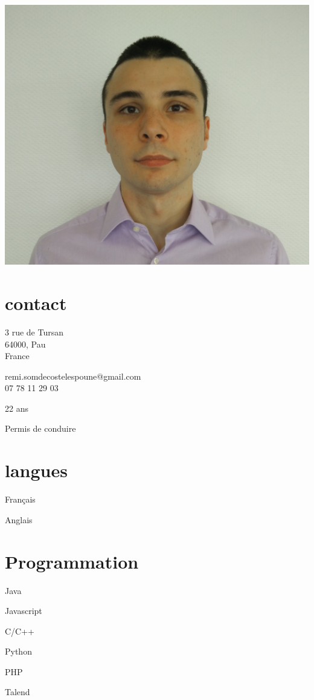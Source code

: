 \begin{aside}
%
\includegraphics[width=1\textwidth]{photo.jpg}
\section{contact}
    \item{
        3 rue de Tursan\\
        64000, Pau\\
        France
    }
    \item{
        remi.somdecosteles\-poune@gmail.com\\
        07 78 11 29 03
    }
    \item 22 ans
    \item Permis de conduire

\section{langues}
    \item Français
    \item Anglais

\section{Programmation}
    \item Java
    \item Javascript
    \item C/C++
    \item Python
    \item PHP
    \item Talend
\end{aside}
